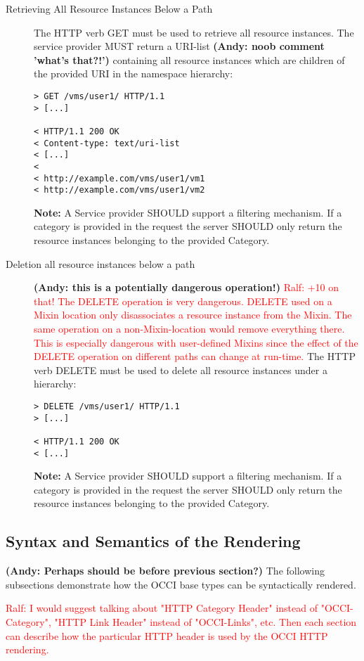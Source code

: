 \documentclass[10pt,a4paper]{article}
\newcommand{\ralf}[1]{\textcolor{red}{Ralf: #1}}
\begin{document}
\begin{description}
\item[Retrieving All Resource Instances Below a Path] The HTTP verb
  GET must be used to retrieve all resource instances. The service
  provider MUST return a URI-list \textbf{(Andy: noob comment 'what's that?!')} 
  containing all resource instances
  which are children of the provided URI in the namespace hierarchy:
\begin{verbatim}
> GET /vms/user1/ HTTP/1.1
> [...]
 
< HTTP/1.1 200 OK
< Content-type: text/uri-list
< [...]
< 
< http://example.com/vms/user1/vm1
< http://example.com/vms/user1/vm2
\end{verbatim}
\textbf{Note:} A Service provider SHOULD support a filtering
mechanism. If a category is provided in the request the server SHOULD
only return the resource instances belonging to the provided
Category.

\item[Deletion all resource instances below a path] 
\textbf{(Andy: this is a potentially dangerous operation!)}
\ralf{+10 on that! The DELETE operation is very dangerous.  DELETE used on a
Mixin location only disassociates a resource instance from the Mixin.  The same
operation on a non-Mixin-location would remove everything there.  This is
especially dangerous with user-defined Mixins since the effect of the DELETE
operation on different paths can change at run-time.}
The HTTP verb
  DELETE must be used to delete all resource instances under a
  hierarchy:
\begin{verbatim}
> DELETE /vms/user1/ HTTP/1.1
> [...]
 
< HTTP/1.1 200 OK
< [...]
\end{verbatim}
\textbf{Note:} A Service provider SHOULD support a filtering
mechanism. If a category is provided in the request the server SHOULD
only return the resource instances belonging to the provided
Category.
\end{description}

\subsection{Syntax and Semantics of the Rendering}
\label{sec:syntax}

\textbf{(Andy: Perhaps should be before previous section?)}
The following subsections demonstrate how the OCCI base types can be
syntactically rendered.

\ralf{I would suggest talking about "HTTP Category Header" instead of
"OCCI-Category", "HTTP Link Header" instead of "OCCI-Links", etc. Then each
section can describe how the particular HTTP header is used by the OCCI HTTP
rendering.}
\end{document}
